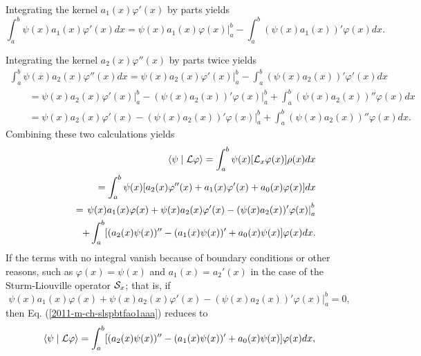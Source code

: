 Integrating the  kernel $a_1(x) \varphi'(x)$ by parts yields
\begin{equation}
\int_a^b
\psi (x)
  a_1(x) \varphi'(x)
dx
=
\left.
\psi (x)
  a_1(x) \varphi(x)
\right|_a^b -  \int_a^b
(\psi (x)
  a_1(x) )'\varphi(x)
dx
.
\end{equation}

Integrating the  kernel $a_2(x) \varphi''(x)$ by parts twice yields
\begin{equation}
\begin{split}
\int_a^b
\psi (x)
  a_2(x) \varphi''(x)
dx
=
\left.
\psi (x)
  a_2(x) \varphi'(x)
\right|_a^b -  \int_a^b
(\psi (x)
  a_2(x) )'\varphi'(x)
dx
\\
\qquad =
\left.
\psi (x)
  a_2(x) \varphi'(x)
\right|_a^b -
\left.
(\psi (x)
  a_2(x))' \varphi(x)
\right|_a^b
+
  \int_a^b
(\psi (x)
  a_2(x) )''\varphi(x)
dx    \\
\qquad =
\left.
\psi (x)
  a_2(x) \varphi'(x)
 -
(\psi (x)
  a_2(x))' \varphi(x)
\right|_a^b
+
  \int_a^b
(\psi (x)
  a_2(x) )''\varphi(x)
dx
.
\end{split}
\end{equation}
Combining these two calculations yields
\begin{equation}
\begin{split}
\langle \psi \mid {\cal L} \varphi \rangle
=
\int_a^b
\psi (x) [{\cal L}_x\varphi (x)]
\rho  (x)         dx   \\
\qquad =
\int_a^b
\psi (x)
[a_2(x) \varphi''(x) + a_1(x) \varphi'(x) + a_0(x) \varphi (x)]
dx      \\
\qquad =
\left.
\psi (x)
  a_1(x) \varphi(x)
+
\psi (x)
  a_2(x) \varphi'(x)
 -
(\psi (x)
  a_2(x))' \varphi(x)
\right|_a^b   \\
\qquad
\qquad
+
  \int_a^b
[( a_2(x)\psi (x) )'' - ( a_1(x)\psi (x)  )'    + a_0(x) \psi (x)] \varphi(x)
dx
.
\end{split}
\label{2011-m-ch-slspbtfao1aaa}
\end{equation}
If the terms with no integral vanish because of boundary conditions or other reasons,
such as $\varphi (x)= \psi (x)$ and $a_1(x)=a_2'(x)$ in the case of the Sturm-Liouville
operator ${\cal S}_x$; that is, if
$$
\left.
\psi (x)
  a_1(x) \varphi(x)
+
\psi (x)
  a_2(x) \varphi'(x)
 -
(\psi (x)
  a_2(x))' \varphi(x)
\right|_a^b
=0,
$$
then Eq. (\ref{2011-m-ch-slspbtfao1aaa}) reduces to
\begin{equation}
\langle \psi \mid {\cal L} \varphi \rangle
=
  \int_a^b
[( a_2(x)\psi (x) )'' - ( a_1(x)\psi (x)  )'    + a_0(x) \psi (x)] \varphi(x)
dx
,
\label{2011-m-ch-slspbtfao1aaa1}
\end{equation}
